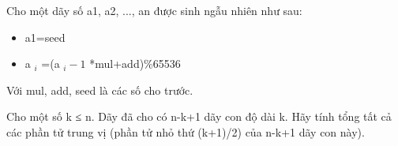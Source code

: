 Cho một dãy số a1, a2, ..., an được sinh ngẫu nhiên như sau:  
\begin{itemize}
	\item     a1=seed   
	\item     a    $_     i    $    =(a    $_     i-1    $    *mul+add)\%65536   
\end{itemize}

   Với mul, add, seed là các số cho trước.  

   Cho một số k ≤ n. Dãy đã cho có n-k+1 dãy con độ dài k. Hãy tính tổng tất cả các phần tử trung vị (phần tử nhỏ thứ (k+1)/2) của n-k+1 dãy con này).